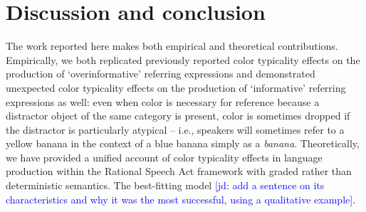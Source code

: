 \documentclass[10pt,letterpaper]{article}
\newcommand{\jd}[1]{\textcolor{Blue}{[jd: #1]}}
\begin{document}




\section{Discussion and conclusion}

The work reported here makes both empirical and theoretical contributions. Empirically, we both replicated previously reported color typicality effects on the production of `overinformative' referring expressions \cite{sedivy2003a, westerbeek2015, rubiofernandez2016} and demonstrated unexpected color typicality effects on the production of `informative' referring expressions as well: even when color is necessary for reference because a distractor object of the same category is present, color is sometimes dropped if the distractor is particularly atypical -- i.e., speakers will sometimes refer to a yellow banana in the context of a blue banana simply as a \emph{banana}. Theoretically, we have provided a unified account of color typicality effects in language production within the Rational Speech Act framework \cite{GoodmanFrank2016} with graded rather than deterministic semantics. The best-fitting model \jd{add a sentence on its characteristics and why it was the most successful, using a qualitative example}.
\end{document}
